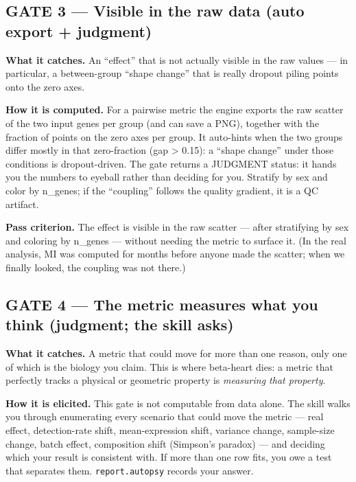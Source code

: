 \documentclass[
  11pt,
]{article}
\begin{document}
\subsection{GATE 3 --- Visible in the raw data (auto export +
judgment)}\label{gate-3-visible-in-the-raw-data-auto-export-judgment}

\textbf{What it catches.} An ``effect'' that is not actually visible in
the raw values --- in particular, a between-group ``shape change'' that
is really dropout piling points onto the zero axes.

\textbf{How it is computed.} For a pairwise metric the engine exports
the raw scatter of the two input genes per group (and can save a PNG),
together with the fraction of points on the zero axes per group. It
auto-hints when the two groups differ mostly in that zero-fraction (gap
\textgreater{} 0.15): a ``shape change'' under those conditions is
dropout-driven. The gate returns a JUDGMENT status: it hands you the
numbers to eyeball rather than deciding for you. Stratify by sex and
color by n\_genes; if the ``coupling'' follows the quality gradient, it
is a QC artifact.

\textbf{Pass criterion.} The effect is visible in the raw scatter ---
after stratifying by sex and coloring by n\_genes --- without needing
the metric to surface it. (In the real analysis, MI was computed for
months before anyone made the scatter; when we finally looked, the
coupling was not there.)

\subsection{GATE 4 --- The metric measures what you think (judgment; the
skill
asks)}\label{gate-4-the-metric-measures-what-you-think-judgment-the-skill-asks}

\textbf{What it catches.} A metric that could move for more than one
reason, only one of which is the biology you claim. This is where
beta-heart dies: a metric that perfectly tracks a physical or geometric
property is \emph{measuring that property}.

\textbf{How it is elicited.} This gate is not computable from data
alone. The skill walks you through enumerating every scenario that could
move the metric --- real effect, detection-rate shift, mean-expression
shift, variance change, sample-size change, batch effect, composition
shift (Simpson's paradox) --- and deciding which your result is
consistent with. If more than one row fits, you owe a test that
separates them. \texttt{report.autopsy} records your answer.
\end{document}
